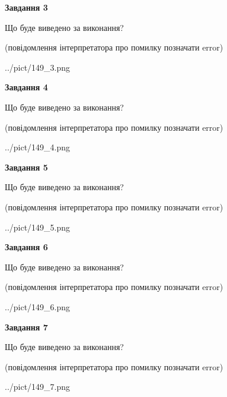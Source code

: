 \documentclass[12pt, ukrainian]{article}
\begin{document}
{\begin {large}
{\begin {center}\textbf{Завдання 3}\end {center}}\par
Що буде виведено за виконання?\par
 (повідомлення інтерпретатора про помилку позначати error)\par
\begin{center}
	{../pict/149_3.png}
\end{center}
\newpage

{\begin {center}\textbf{Завдання 4}\end {center}}\par
Що буде виведено за виконання?\par
 (повідомлення інтерпретатора про помилку позначати error)\par
\begin{center}
	{../pict/149_4.png}
\end{center}
\newpage

{\begin {center}\textbf{Завдання 5}\end {center}}\par
Що буде виведено за виконання?\par
 (повідомлення інтерпретатора про помилку позначати error)\par
\begin{center}
	{../pict/149_5.png}
\end{center}
\newpage

{\begin {center}\textbf{Завдання 6}\end {center}}\par
Що буде виведено за виконання?\par
 (повідомлення інтерпретатора про помилку позначати error)\par
\begin{center}
	{../pict/149_6.png}
\end{center}
\newpage

{\begin {center}\textbf{Завдання 7}\end {center}}\par
Що буде виведено за виконання?\par
 (повідомлення інтерпретатора про помилку позначати error)\par
\begin{center}
	{../pict/149_7.png}
\end{center}
\newpage


\end{large}}
\end{document}

